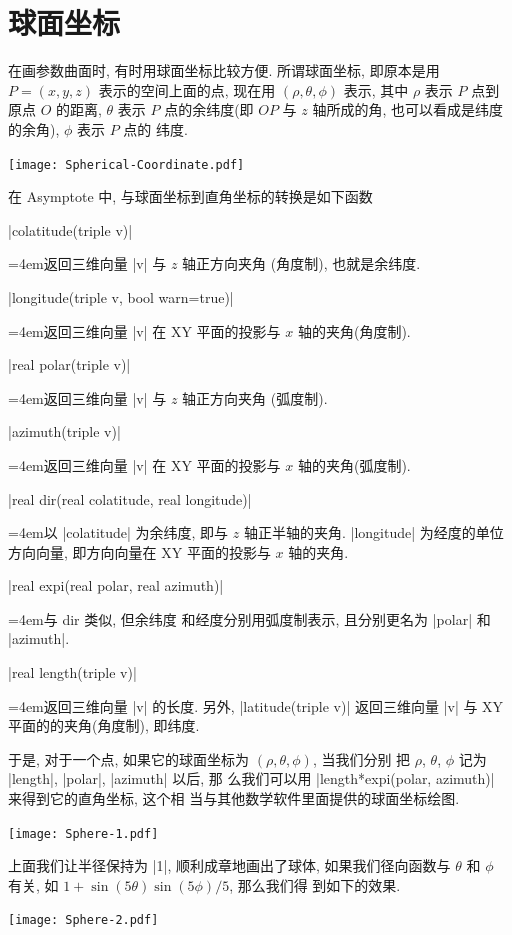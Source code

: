 \documentclass[nofonts,CJKnormalspaces]{ctexbook}[2009/05/20]
\newenvironment{funclist}{\trivlist
  \parindent=0pt
\item[]
  \def\item{\medskip\par\leftskip=0pt}
  \def\go{\par\leftskip=4em}}
{\endtrivlist}
\begin{document}
\section{球面坐标}
在画参数曲面时, 有时用球面坐标比较方便. 所谓球面坐标, 即原本是用
$P=(x,y,z)$ 表示的空间上面的点, 现在用 $(\rho,\theta,\phi)$ 表示, 其中
$\rho$ 表示 $P$ 点到原点 $O$ 的距离, $\theta$ 表示 $P$ 点的余纬度(即
$OP$ 与 $z$ 轴所成的角, 也可以看成是纬度的余角), $\phi$ 表示 $P$ 点的
纬度.
\begin{center}\texttt{[image: Spherical-Coordinate.pdf]}\end{center}%

在 Asymptote 中, 与球面坐标到直角坐标的转换是如下函数
\begin{funclist}
\item |colatitude(triple v)| \go 返回三维向量 |v| 与 $z$ 轴正方向夹角
  (角度制), 也就是余纬度.
\item |longitude(triple v, bool warn=true)| \go 返回三维向量 |v| 在 XY
  平面的投影与 $x$ 轴的夹角(角度制).
\item |real polar(triple v)| \go 返回三维向量 |v| 与 $z$ 轴正方向夹角
  (弧度制).
\item |azimuth(triple v)| \go 返回三维向量 |v| 在 XY 平面的投影与 $x$
  轴的夹角(弧度制).
\item |real dir(real colatitude, real longitude)| \go 以 |colatitude|
  为余纬度, 即与 $z$ 轴正半轴的夹角. |longitude| 为经度的单位方向向量,
  即方向向量在 XY 平面的投影与 $x$ 轴的夹角.
\item |real expi(real polar, real azimuth)| \go 与 dir 类似, 但余纬度
  和经度分别用弧度制表示, 且分别更名为 |polar| 和 |azimuth|.
\item |real length(triple v)| \go 返回三维向量 |v| 的长度.
\end{funclist}
另外, |latitude(triple v)| 返回三维向量 |v| 与 XY 平面的的夹角(角度制),
即纬度.

于是, 对于一个点, 如果它的球面坐标为 $(\rho,\theta,\phi)$, 当我们分别
把 $\rho$, $\theta$, $\phi$ 记为 |length|, |polar|, |azimuth| 以后, 那
么我们可以用 |length*expi(polar, azimuth)| 来得到它的直角坐标, 这个相
当与其他数学软件里面提供的球面坐标绘图.

\begin{center}\texttt{[image: Sphere-1.pdf]}\end{center}%

上面我们让半径保持为 |1|, 顺利成章地画出了球体, 如果我们径向函数与
$\theta$ 和 $\phi$ 有关, 如 $1+\sin(5\theta)\sin(5\phi)/5$, 那么我们得
到如下的效果.
\begin{center}\texttt{[image: Sphere-2.pdf]}\end{center}%

\end{document}

